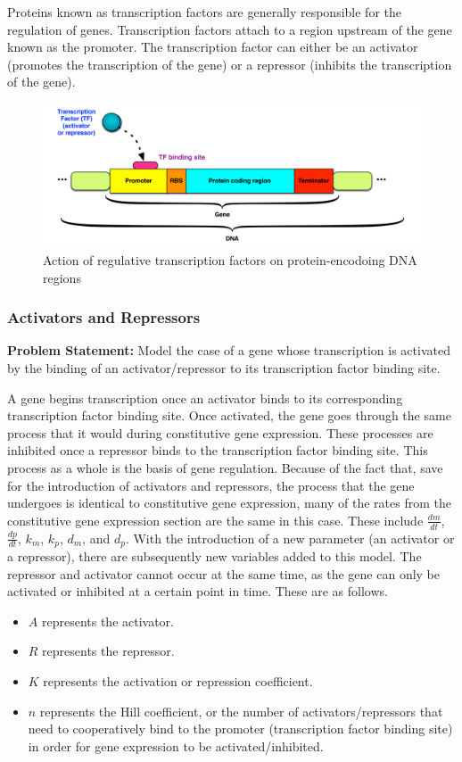 Proteins known as transcription factors are generally responsible for the regulation of genes.
Transcription factors attach to a region upstream of the gene known as the promoter.
The transcription factor can either be an activator (promotes the transcription of the gene) or a repressor (inhibits the transcription of the gene). 

\begin{figure}[htbp!]
    \centering
    \includegraphics[width=.5\textwidth]{pictures/diffeq/img3.png}
    \caption{Action of regulative transcription factors on protein-encodoing DNA regions}
\end{figure}

\subsubsection{Activators and Repressors}

\textbf{Problem Statement: } Model the case of a gene whose transcription is activated by the binding of an activator/repressor to its transcription factor binding site.

A gene begins transcription once an activator binds to its corresponding transcription factor binding site.
Once activated, the gene goes through the same process that it would during constitutive gene expression.
These processes are inhibited once a repressor binds to the transcription factor binding site.
This process as a whole is the basis of gene regulation.
Because of the fact that, save for the introduction of activators and repressors, the process that the gene undergoes is identical to constitutive gene expression, many of the rates from the constitutive gene expression section are the same in this case.
These include $\frac{dm}{dt}$, $\frac{dp}{dt}$, $k_{m}$, $k_{p}$, $d_{m}$, and $d_{p}$.
With the introduction of a new parameter (an activator or a repressor), there are subsequently new variables added to this model.
The repressor and activator cannot occur at the same time, as the gene can only be activated or inhibited at a certain point in time.
These are as follows.

\begin{itemize}
    \item $A$ represents the activator.
    \item $R$ represents the repressor.
    \item $K$ represents the activation or repression coefficient.
    \item $n$ represents the Hill coefficient, or the number of activators/repressors that need to cooperatively bind to the promoter (transcription factor binding site) in order for gene expression to be activated/inhibited.
\end{itemize}

